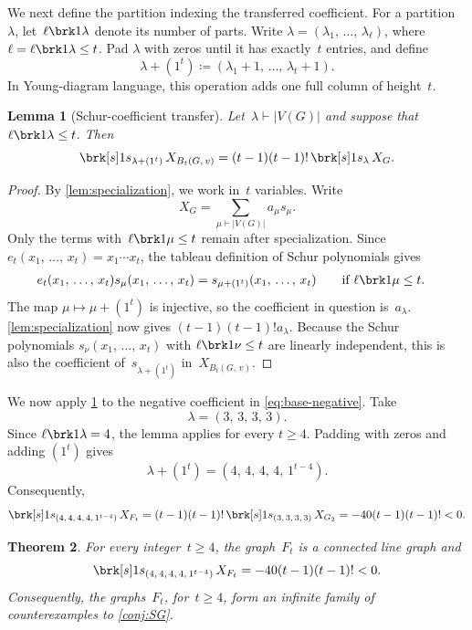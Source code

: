 \documentclass[11pt]{amsart}
\numberwithin{equation}{section}
\newtheorem{lemma}{Lemma}[section]
\newtheorem{theorem}[lemma]{Theorem}
\theoremstyle{remark}
\newcommand{\CSF}{X}
\newcommand{\Gtwo}{G_{2}}
\newcommand{\Ft}{F_t}
\newcommand{\Bt}{B_t(G,\,v)}
\newcommand{\coeff}[2]{\brk[s]1{s_{#1}}\,#2}
\begin{document}
We next define the partition indexing the transferred coefficient.  For a
partition~$\lambda$, let~$\ell\brk1{\lambda}$ denote its number of parts.
Write $\lambda=(\lambda_1,\,\dots,\,\lambda_\ell)$, where
$\ell=\ell\brk1{\lambda}\le t$.  Pad
$\lambda$ with zeros until it has exactly~$t$ entries, and define
\begin{equation}\label{eq:lambda-plus-column}
\lambda+(1^t)
\coloneqq(\lambda_1+1,\,\dots,\,\lambda_t+1).
\end{equation}
In Young-diagram language, this operation adds one full column of height~$t$.


\begin{lemma}[Schur-coefficient transfer]\label{lem:transfer}
Let~$\lambda\vdash \lvert V(G)\rvert$ and suppose that
$\ell\brk1{\lambda}\le t$.  Then
\[
\coeff{\lambda+(1^t)}{\CSF_{\Bt}}
=(t-1)(t-1)!\,
\coeff{\lambda}{\CSF_G}.
\]
\end{lemma}

\begin{proof}
By \cref{lem:specialization}, we work in~$t$ variables.  Write
\[
\CSF_G=\sum_{\mu\vdash \lvert V(G)\rvert}a_\mu s_\mu.
\]
Only the terms with~$\ell\brk1{\mu}\le t$ remain after specialization.  Since
$e_t(x_1,\,\dots,\,x_t)=x_1\dotsm x_t$, the tableau definition of Schur
polynomials gives
\[
\begin{aligned}
e_t(x_1,\,\dots,\,x_t)s_\mu(x_1,\,\dots,\,x_t)
&=s_{\mu+(1^t)}(x_1,\,\dots,\,x_t)
\qquad\text{if }\ell\brk1{\mu}\le t.
\end{aligned}
\]
The map $\mu\mapsto\mu+(1^t)$ is injective, so the coefficient in question
is~$a_\lambda$.  \cref{lem:specialization} now gives
$(t-1)(t-1)!a_\lambda$.  Because the Schur polynomials
$s_\nu(x_1,\,\dots,\,x_t)$ with $\ell\brk1{\nu}\le t$ are linearly independent,
this is also the coefficient of~$s_{\lambda+(1^t)}$ in~$\CSF_{\Bt}$.
\end{proof}


We now apply \cref{lem:transfer} to the negative coefficient in
\cref{eq:base-negative}.  Take
\[
\lambda=(3,\,3,\,3,\,3).
\]
Since $\ell\brk1{\lambda}=4$, the lemma applies for every $t\ge 4$.  Padding with
zeros and adding $(1^t)$ gives
\[
\lambda+(1^t)=(4,\,4,\,4,\,4,\,1^{t-4}).
\]
Consequently,
\begin{equation}\label{eq:family-negative}
\coeff{(4,\,4,\,4,\,4,\,1^{t-4})}{\CSF_{\Ft}}
=(t-1)(t-1)!\,
\coeff{(3,\,3,\,3,\,3)}{\CSF_{\Gtwo}}
=-40(t-1)(t-1)!<0.
\end{equation}

\begin{theorem}\label{thm:infinite-family}
For every integer~$t\ge4$, the graph~$\Ft$ is a connected line graph and
\[
\coeff{(4,\,4,\,4,\,4,\,1^{t-4})}{\CSF_{\Ft}}
=-40(t-1)(t-1)!<0.
\]
Consequently, the graphs~$\Ft$, for~$t\ge4$, form an infinite family of counterexamples to \cref{conj:SG}.
\end{theorem}
\end{document}
